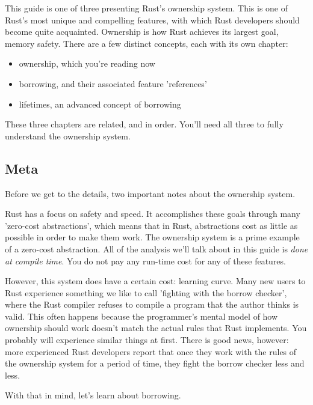 This guide is one of three presenting Rust's ownership system. This is one of Rust's most unique and compelling features, with 
which Rust developers should become quite acquainted. Ownership is how Rust achieves its largest goal, memory safety. There are 
a few distinct concepts, each with its own chapter:

\begin{itemize}
  \item{ownership, which you're reading now}
  \item{borrowing, and their associated feature 'references'}
  \item{lifetimes, an advanced concept of borrowing}
\end{itemize}

These three chapters are related, and in order. You'll need all three to fully understand the ownership system.

\subsection*{Meta}

Before we get to the details, two important notes about the ownership system.

\blank

Rust has a focus on safety and speed. It accomplishes these goals through many 'zero-cost abstractions', which means that in 
Rust, abstractions cost as little as possible in order to make them work. The ownership system is a prime example of a zero-cost
abstraction. All of the analysis we'll talk about in this guide is \emph{done at compile time}. You do not pay any run-time cost 
for any of these features.

\blank

However, this system does have a certain cost: learning curve. Many new users to Rust experience something we like to call 
'fighting with the borrow checker', where the Rust compiler refuses to compile a program that the author thinks is valid. 
This often happens because the programmer's mental model of how ownership should work doesn't match the actual rules that Rust 
implements. You probably will experience similar things at first. There is good news, however: more experienced Rust developers 
report that once they work with the rules of the ownership system for a period of time, they fight the borrow checker less and less.

\blank

With that in mind, let's learn about borrowing.

